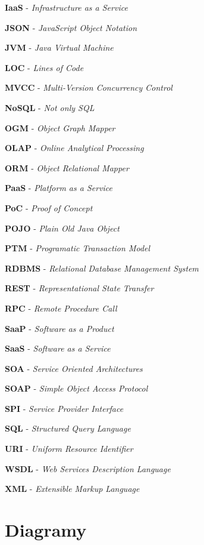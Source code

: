 \documentclass[11pt,twoside,a4paper]{book}
\begin{document}
\textbf{IaaS} - \textit{Infrastructure as a Service}

\textbf{JSON} - \textit{JavaScript Object Notation}

\textbf{JVM} - \textit{Java Virtual Machine}

\textbf{LOC} - \textit{Lines of Code}

\textbf{MVCC} - \textit{Multi-Version Concurrency Control}

\textbf{NoSQL} - \textit{Not only SQL}

\textbf{OGM} - \textit{Object Graph Mapper}

\textbf{OLAP} - \textit{Online Analytical Processing}

\textbf{ORM} - \textit{Object Relational Mapper}

\textbf{PaaS} - \textit{Platform as a Service}

\textbf{PoC} - \textit{Proof of Concept}

\textbf{POJO} - \textit{Plain Old Java Object}

\textbf{PTM} - \textit{Programatic Transaction Model}

\textbf{RDBMS} - \textit{Relational Database Management System}

\textbf{REST} - \textit{Representational State Transfer}

\textbf{RPC} - \textit{Remote Procedure Call}

\textbf{SaaP} - \textit{Software as a Product}

\textbf{SaaS} - \textit{Software as a Service}

\textbf{SOA} - \textit{Service Oriented Architectures}

\textbf{SOAP} - \textit{Simple Object Access Protocol}

\textbf{SPI} - \textit{Service Provider Interface}

\textbf{SQL} - \textit{Structured Query Language}

\textbf{URI} - \textit{Uniform Resource Identifier}

\textbf{WSDL} - \textit{Web Services Description Language}

\textbf{XML} - \textit{Extensible Markup Language}


\chapter{Diagramy}
\end{document}
